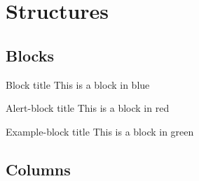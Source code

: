 \documentclass{beamer}
\begin{document}
\begin{frame}
\hyperlink{MY_LABEL}{}

\hyperlink{MY_LABEL}{}

\hyperlink{MY_LABEL}{}
\end{frame}

\section{Structures}
\subsection{Blocks}

\begin{frame}
\begin{block}{Block title}
This is a block in blue
\end{block}

\begin{alertblock}{Alert-block title}
This is a block in red
\end{alertblock}

\begin{exampleblock}{Example-block title}
This is a block in green
\end{exampleblock}    
  
\end{frame}

\subsection{Columns}

% 
\end{document}
